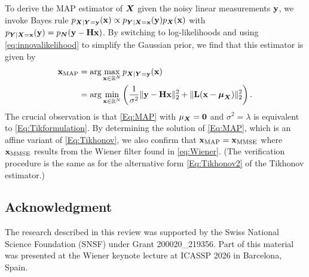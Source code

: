 \documentclass[11pt, english,english]{article}
\newcommand{\R}{ \mathbb{R}}
\def\V#1{{\boldsymbol{#1}}}         %
\def\M#1{{\bf{#1}}}  %
\renewcommand{\[}{\begin{equation}}
\renewcommand{\]}[1]{\label{eq:#1}\end{equation}}
\def\VRand#1{{\uppercase{\boldsymbol #1}}}         %
\begin{document}
To derive the MAP estimator of 
$\VRand X$ given the noisy linear measurements $\M y$, we invoke Bayes rule $p_{\VRand X|\VRand Y=\M y}(\M x)\propto p_{\VRand Y|\VRand X=\M x}(\M y) p_{\VRand X}(\M x)$
with $p_{\VRand Y|\VRand X=\M x}(\M y)=p_{\VRand N}(\M y - \M H \M x)$. By switching to log-likelihoods and using \eqref{eq:innovalikelihood} to simplify the Gaussian prior, we 
find that this estimator is given by %
\begin{align}
\label{Eq:MAP}\M x_{\rm MAP}&=\arg \max_{\M x \in \R^N} p_{\VRand X|\VRand Y=\M y}(\M x)\nonumber\\
&=\arg \min_{\M x \in \R^N} \left(\frac{1}{\sigma^2} \|\M y - \M H \M x\|_2^2 +  \|\M L (\M x-\V \mu_{\VRand x})\|_2^2\right).
\end{align}
The crucial observation is that \eqref{Eq:MAP} with $\mu_{\VRand x}=\V 0$ and $\sigma^2=\lambda$ is equivalent to \eqref{Eq:Tikformulation}. By determining the solution of \eqref{Eq:MAP}, which is an affine variant of \eqref{Eq:Tikhonov}, we also confirm that $\M x_{\rm MAP}=\M x_{\rm MMSE}$ where $\M x_{\rm MMSE}$ results from the Wiener filter found in \eqref{eq:Wiener}. (The verification procedure is the same as for the alternative form \eqref{Eq:Tikhonov2} of the Tikhonov estimator.)

\subsection*{Acknowledgment}
The research described in this review was supported by the Swiss National Science Foundation (SNSF) under Grant 200020\_219356. Part of this material was presented at the Wiener keynote lecture at ICASSP 2026 in Barcelona, Spain.




% 
% 

%
%


%

\end{document}
